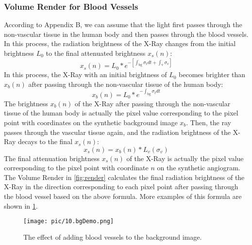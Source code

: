 \subsubsection{Volume Render for Blood Vessels}
According to Appendix B, we can assume that the light first passes through the non-vascular tissue in the human body and then passes through the blood vessels. In this process, the radiation brightness of the X-Ray changes from the initial brightness $L_0$ to the final attenuated brightness $x_s(n)$:
\begin{equation}
x_s(n) = L_0 * e^{-\left[\int_{\text{bg}} \sigma_t dt + \int_{\text{v}} \sigma_v\right]}
\end{equation}
In this process, the X-Ray with an initial brightness of $L_0$ becomes brighter than $x_b(n)$ after passing through the non-vascular tissue of the human body:
\begin{equation}
x_b(n) = L_0 * e^{-\int_{\text{bg}} \sigma_t dt}
\end{equation}
The brightness $x_b(n)$ of the X-Ray after passing through the non-vascular tissue of the human body is actually the pixel value corresponding to the pixel point with coordinates on the synthetic background image $x_b$. Then, the ray passes through the vascular tissue again, and the radiation brightness of the X-Ray decays to the final $x_s(n)$:
\begin{equation}
x_s(n) = x_b(n) * L_v(\sigma_v)
\end{equation}
The final attenuation brightness $x_s(n)$ of the X-Ray is actually the pixel value corresponding to the pixel point with coordinate $n$ on the synthetic angiogram. 
The Volume Render in \cref{fig:render} calculates the final radiation brightness of the X-Ray in the direction corresponding to each pixel point after passing through the blood vessel based on the above formula. 
More examples of this formula are shown in \cref{fig:bgDemo}.

\begin{figure}[htbp]
  \centering
  \texttt{[image: pic/10.bgDemo.png]}
  \caption{The effect of adding blood vessels to the background image.}
  \label{fig:bgDemo}
\end{figure}

